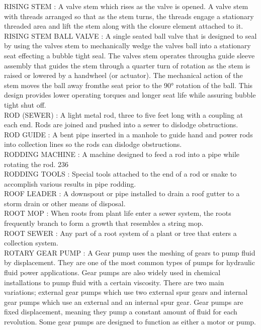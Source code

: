 RISING STEM :   A valve stem which rises as the valve is opened.  A valve stem with threads arranged so that as the stem turns, the threads engage a stationary threaded area and lift the stem along with the closure element attached to it.\\
\vspace{0.15cm}
RISING STEM BALL VALVE :   A single seated ball valve that is designed to seal by using the valves stem to mechanically wedge the valves ball into a stationary seat effecting a bubble tight seal. The valves stem operates througha guide sleeve assembly that guides the stem through a quarter turn of rotation as the stem is raised or lowered by a handwheel (or actuator). The mechanical action of the stem moves the ball away fromthe seat prior to the 90° rotation of the ball. This design provides lower operating torques and longer seat life while assuring bubble tight shut off.\\
\vspace{0.15cm}
ROD (SEWER) :  A light metal rod, three to five feet long with a coupling at each end. Rods are joined and pushed into a sewer to dislodge obstructions. \\
\vspace{0.15cm}
ROD GUIDE :  A bent pipe inserted in a manhole to guide hand and power rods into collection lines so the rods can dislodge obstructions. \\
\vspace{0.15cm}
RODDING MACHINE :  A machine designed to feed a rod into a pipe while rotating the rod. 236 \\
\vspace{0.15cm}
RODDING TOOLS :  Special tools attached to the end of a rod or snake to accomplish various results in pipe rodding. \\
\vspace{0.15cm}
ROOF LEADER :  A downspout or pipe installed to drain a roof gutter to a storm drain or other means of disposal. \\
\vspace{0.15cm}
ROOT MOP :  When roots from plant life enter a sewer system, the roots frequently branch to form a growth that resembles a string mop. \\
\vspace{0.15cm}
ROOT SEWER :  Any part of a root system of a plant or tree that enters a collection system. \\
\vspace{0.15cm}
ROTARY GEAR PUMP :   A Gear pump uses the meshing of gears to pump fluid by displacement. They are one of the most common types of pumps for hydraulic fluid power applications. Gear pumps are also widely used in chemical installations to pump fluid with a certain viscosity. There are two main variations; external gear pumps which use two external spur gears and internal gear pumps which use an external and an internal spur gear. Gear pumps are fixed displacement, meaning they pump a constant amount of fluid for each revolution. Some gear pumps are designed to function as either a motor or pump.\\
